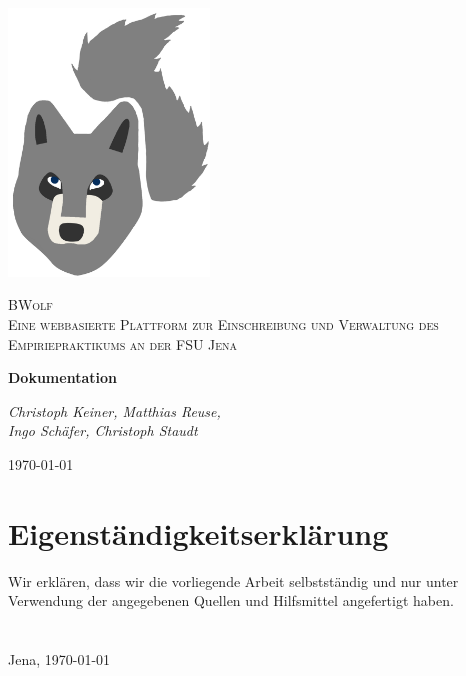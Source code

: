 \documentclass[12pt,a4paper]{report}
\begin{document}
    
    \begin{titlepage}
        \centering
        \includegraphics[width=0.4\textwidth]{./LogoSoFar.png}\par\vspace{1cm}
        {\scshape \LARGE BWolf \\ \Large Eine webbasierte Plattform zur
            Einschreibung und Verwaltung des
            Empiriepraktikums an der FSU Jena\par}
        \vspace{1.5cm}
        {\huge\bfseries Dokumentation\par}
        \vspace{1.5cm}
        {\large\itshape Christoph Keiner, Matthias Reuse,\\ Ingo Schäfer, Christoph Staudt\par}
        \vspace{1.0cm}
        {\large \today\par}
    \end{titlepage}
    \onehalfspacing

    \section*{Eigenständigkeitserklärung}
        Wir erklären, dass wir die vorliegende Arbeit selbstständig und nur unter Verwendung der angegebenen Quellen und Hilfsmittel angefertigt haben.\\\\\\
        Jena, \today\\
        
\end{document}
